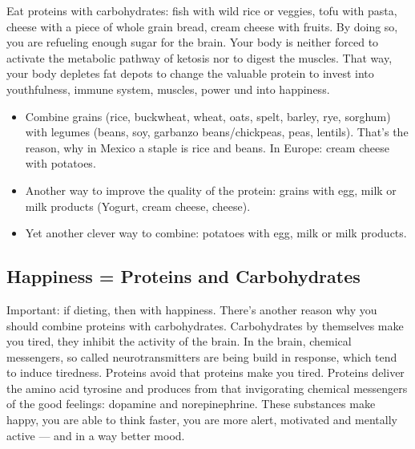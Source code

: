 \documentclass[../main.tex]{subfiles}
\begin{document}
    Eat proteins with carbohydrates: fish with wild rice or veggies, tofu with pasta, cheese with a piece of whole grain bread,
    cream cheese with fruits.
    By doing so, you are refueling enough sugar for the brain.
    Your body is neither forced to activate the metabolic pathway of ketosis nor to digest the muscles.
    That way, your body depletes fat depots to change the valuable protein to invest
    into youthfulness, immune system, muscles, power und into happiness.
    \begin{itemize}
    \item Combine grains (rice, buckwheat, wheat, oats, spelt, barley, rye, sorghum) with legumes (beans, soy, garbanzo beans/chickpeas, peas, lentils).
      That's the reason, why in Mexico a staple is rice and beans. In Europe: cream cheese with potatoes.
    \item Another way to improve the quality of the protein: grains with egg, milk or milk products (Yogurt, cream cheese, cheese).
      \item Yet another clever way to combine: potatoes with egg, milk or milk products.
      \end{itemize}

      \subsection{Happiness = Proteins and Carbohydrates}

      Important: if dieting, then with  happiness.
      There's another reason why you should combine proteins with carbohydrates.
      Carbohydrates by themselves make you tired, they inhibit the activity of the brain.
      In the brain, chemical messengers, so called neurotransmitters are being build in response, which tend to induce tiredness.
      Proteins avoid that proteins make you tired.
      Proteins deliver the amino acid tyrosine and produces from that invigorating chemical messengers of the good feelings:
      dopamine and norepinephrine.
      These substances make happy, you are able to think faster, you are more alert, motivated and mentally active --- and in a way better mood.
\end{document}
